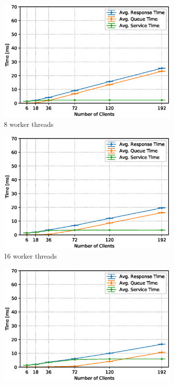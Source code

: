 \documentclass[11pt,a4paper]{article}
\begin{document}
\begin{figure}
    \begin{subfigure}{.5\textwidth}
        \includegraphics[width=1\linewidth]{plots/4b_extendedLatencyMiddleware_8w.eps}
        \caption{8 worker threads}
    \end{subfigure}
    \begin{subfigure}{.5\textwidth}
        \includegraphics[width=1\linewidth]{plots/4b_extendedLatencyMiddleware_16w.eps}
        \caption{16 worker threads}
    \end{subfigure}
    \begin{subfigure}{.5\textwidth}
        \includegraphics[width=1\linewidth]{plots/4b_extendedLatencyMiddleware_32w.eps}

\end{subfigure}
\end{figure}
\end{document}
